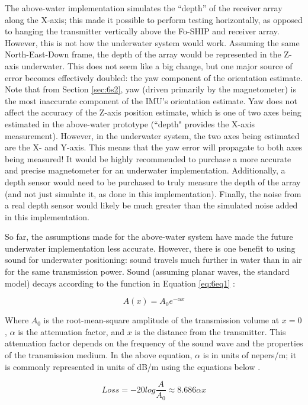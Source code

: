 \documentclass[11pt]{ucthesisCP}
\begin{document}
The above-water implementation simulates the “depth” of the receiver array along the X-axis; this made it possible to perform testing horizontally, as opposed to hanging the transmitter vertically above the Fo-SHIP and receiver array. However, this is not how the underwater system would work. Assuming the same North-East-Down frame, the depth of the array would be represented in the Z-axis underwater. This does not seem like a big change, but one major source of error becomes effectively doubled: the yaw component of the orientation estimate. Note that from Section \ref{sec:6s2}, yaw (driven primarily by the magnetometer) is the most inaccurate component of the IMU’s orientation estimate. Yaw does not affect the accuracy of the Z-axis position estimate, which is one of two axes being estimated in the above-water prototype (“depth" provides the X-axis measurement). However, in the underwater system, the two axes being estimated are the X- and Y-axis. This means that the yaw error will propagate to both axes being measured! It would be highly recommended to purchase a more accurate and precise magnetometer for an underwater implementation. Additionally, a depth sensor would need to be purchased to truly measure the depth of the array (and not just simulate it, as done in this implementation). Finally, the noise from a real depth sensor would likely be much greater than the simulated noise added in this implementation.

So far, the assumptions made for the above-water system have made the future underwater implementation less accurate. However, there is one benefit to using sound for underwater positioning: sound travels much further in water than in air for the same transmission power. Sound (assuming planar waves, the standard model) decays according to the function in Equation \ref{eq:6eq1} \cite{computational}:

\begin{equation} \label{eq:6eq1}
	A(x) = A_0 e^{-\alpha x}
\end{equation}

Where \(A_0\) is the root-mean-square amplitude of the transmission volume at \(x=0\), \(\alpha\) is the attenuation factor, and \(x\) is the distance from the transmitter. This attenuation factor depends on the frequency of the sound wave and the properties of the transmission medium. In the above equation, \(\alpha\) is in units of nepers/m; it is commonly represented in units of dB/m using the equations below \cite{computational}.

\begin{equation} \label{eq:6eq2}
	Loss = -20log\frac{A}{A_0} \approx 8.686 \alpha x
\end{equation}
\end{document}
